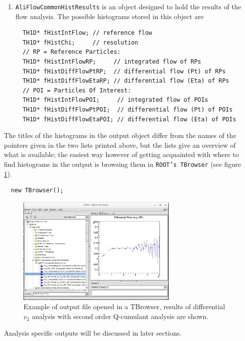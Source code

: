 \documentclass[a4paper]{book}
\numberwithin{equation}{subsection}
\begin{document}
\begin{enumerate}
\begin{lstlisting}
  TProfile* fRefMultVsNoOfRPs;    // <reference multiplicity> versus # of RPs
  TH1F*     fHistRefMult;         // reference multiplicity distribution
  TH2F*     fHistMassPOI;         // mass distribution for POI selection \end{lstlisting}
  This information is from the header file of the AliFlowCommonHist object\footnote{The headers of both output objects can be found in \texttt{\$ALICE\_ROOT/PWG/FLOW/Base/}.}
  \item \texttt{AliFlowCommonHistResults} is an object designed to hold the results of the flow analysis. The possible histograms stored in this object are
  \begin{lstlisting}
  TH1D* fHistIntFlow; // reference flow
  TH1D* fHistChi;     // resolution
  // RP = Reference Particles:  
  TH1D* fHistIntFlowRP;     // integrated flow of RPs
  TH1D* fHistDiffFlowPtRP;  // differential flow (Pt) of RPs
  TH1D* fHistDiffFlowEtaRP; // differential flow (Eta) of RPs
  // POI = Particles Of Interest:
  TH1D* fHistIntFlowPOI;     // integrated flow of POIs
  TH1D* fHistDiffFlowPtPOI;  // differential flow (Pt) of POIs
  TH1D* fHistDiffFlowEtaPOI; // differential flow (Eta) of POIs \end{lstlisting}
  
  \end{enumerate}
  The titles of the histograms in the output object differ from the names of the pointers given in the two lists printed above, but the lists give an overview of what is available; the easiest way however of getting acquainted with where to find histograms in the output is browsing them in \texttt{ROOT's TBrowser} (see figure \ref{fig:browserExample}).
  \begin{lstlisting}
  new TBrowser(); \end{lstlisting}
\begin{figure}
 \includegraphics[width=0.70\textwidth]{figs/browserExample.png}
 \caption[TBrowser with output file]{Example of output file opened in a TBrowser, results of differential $v_2$ analysis with second order Q-cumulant analysis are shown.}
 \label{fig:browserExample}
\end{figure}
Analysis specific outputs will be discussed in later sections. 
\end{document}
